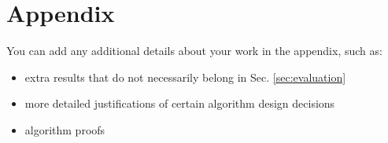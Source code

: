 \documentclass[../report.tex]{subfiles}
\begin{document}
    \section*{Appendix}
    \label{sec:appendix}

    You can add any additional details about your work in the appendix, such as:
    \begin{itemize}
        \item extra results that do not necessarily belong in Sec. \ref{sec:evaluation}
        \item more detailed justifications of certain algorithm design decisions
        \item algorithm proofs
    \end{itemize}
\end{document}
